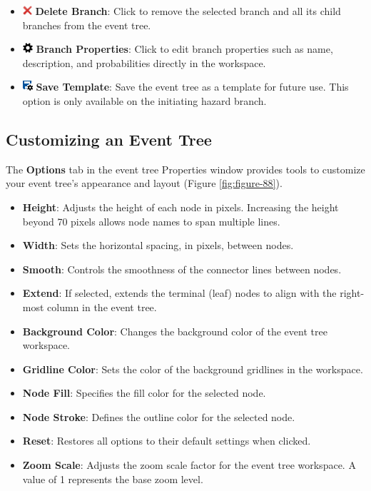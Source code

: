 \documentclass[
]{book}
\begin{document}
\begin{itemize}
\item
  \includegraphics{images/deletebranch.png} \textbf{Delete Branch}: Click to remove the selected branch and all its child branches from the event tree.
\item
  \includegraphics{images/branchproperties.png} \textbf{Branch Properties}: Click to edit branch properties such as name, description, and probabilities directly in the workspace.
\item
  \includegraphics{images/savetemplate.png} \textbf{Save Template}: Save the event tree as a template for future use. This option is only available on the initiating hazard branch.
\end{itemize}

\hypertarget{customizing-an-event-tree}{%
\subsection{Customizing an Event Tree}\label{customizing-an-event-tree}}

The \textbf{Options} tab in the event tree Properties window provides tools to customize your event tree's appearance and layout (Figure \ref{fig:figure-88}).

\begin{itemize}
\item
  \textbf{Height}: Adjusts the height of each node in pixels. Increasing the height beyond 70 pixels allows node names to span multiple lines.
\item
  \textbf{Width}: Sets the horizontal spacing, in pixels, between nodes.
\item
  \textbf{Smooth}: Controls the smoothness of the connector lines between nodes.
\item
  \textbf{Extend}: If selected, extends the terminal (leaf) nodes to align with the right-most column in the event tree.
\item
  \textbf{Background Color}: Changes the background color of the event tree workspace.
\item
  \textbf{Gridline Color}: Sets the color of the background gridlines in the workspace.
\item
  \textbf{Node Fill}: Specifies the fill color for the selected node.
\item
  \textbf{Node Stroke}: Defines the outline color for the selected node.
\item
  \textbf{Reset}: Restores all options to their default settings when clicked.
\item
  \textbf{Zoom Scale}: Adjusts the zoom scale factor for the event tree workspace. A value of 1 represents the base zoom level.
\end{itemize}
\end{document}

